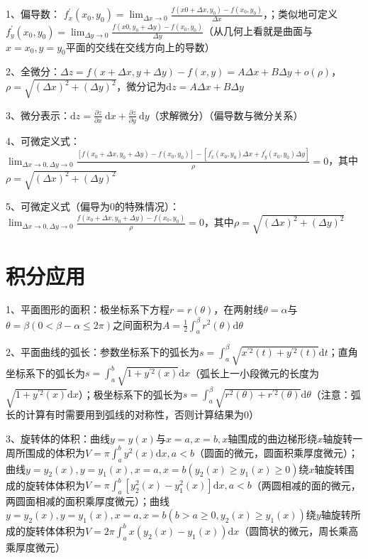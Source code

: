 1、偏导数： $f_{x}^{\prime}\left(x_{0}, y_{0}\right)=\lim_{\Delta x \rightarrow 0} \frac{f\left(x{0}+\Delta x, y_{0}\right)-f\left(x_{0}, y_{0}\right)}{\Delta x}$，；类似地可定义$f_{y}^{\prime}\left(x_{0}, y_{0}\right)=\lim_{\Delta y \rightarrow 0} \frac{f\left(x{0}, y_{0}+\Delta y\right)-f\left(x_{0}, y_{0}\right)}{\Delta y}$（从几何上看就是曲面与$x=x_0,y=y_0$平面的交线在交线方向上的导数）

2、全微分：$\Delta z=f(x+\Delta x, y+\Delta y)-f(x, y)=A \Delta x+B \Delta y+o(\rho)$，$\rho=\sqrt{(\Delta x)^{2}+(\Delta y)^{2}}$，微分记为$\mathrm{d} z=A \Delta x+B \Delta y$

3、微分表示：$\mathrm{d} z=\frac{\partial z}{\partial x} \mathrm{~d} x+\frac{\partial z}{\partial y} \mathrm{~d} y$（求解微分）（偏导数与微分关系）

4、可微定义式：$\lim_{\Delta x \rightarrow 0,\Delta y \rightarrow 0}\frac{\left[f\left(x_{0}+\Delta x, y_{0}+\Delta y\right)-f\left(x_{0}, y_{0}\right)\right]-\left[f_{x}^{\prime}\left(x_{0}, y_{0}\right) \Delta x+f_{y}^{\prime}\left(x_{0}, y_{0}\right) \Delta y\right]}{\rho}=0$，其中$\rho=\sqrt{(\Delta x)^{2}+(\Delta y)^{2}}$

5、可微定义式（偏导为0的特殊情况）：$\lim_{\Delta x \rightarrow 0,\Delta y \rightarrow 0}\frac{f\left(x_{0}+\Delta x, y_{0}+\Delta y\right)-f\left(x_{0}, y_{0}\right)}{\rho}=0$，其中$\rho=\sqrt{(\Delta x)^{2}+(\Delta y)^{2}}$

\section{积分应用}

1、平面图形的面积：极坐标系下方程$r=r(\theta)$，在两射线$\theta=\alpha$与$\theta=\beta(0<\beta-\alpha \leqslant 2 \pi)$之间面积为$A=\frac{1}{2} \int_{a}^{\beta} r^{2}(\theta) \mathrm{d} \theta$

2、平面曲线的弧长：参数坐标系下的弧长为$s=\int_{a}^{\beta} \sqrt{x^{\prime 2}(t)+y^{\prime 2}(t)} \mathrm{d} t$；直角坐标系下的弧长为$s=\int_{a}^{b} \sqrt{1+y^{\prime 2}(x)} \mathrm{d} x$（弧长上一小段微元的长度为$\sqrt{1+y^{\prime 2}(x)} \mathrm{d} x$）；极坐标系下的弧长为$s=\int_{a}^{\beta} \sqrt{r^{2}(\theta)+r^{\prime 2}(\theta)} \mathrm{d} \theta$（注意：弧长的计算有时需要用到弧线的对称性，否则计算结果为0）

3、旋转体的体积：曲线$y=y(x)$与$x=a, x=b, x$轴围成的曲边梯形绕$x$轴旋转一周所围成的体积为$V=\pi \int_{a}^{b} y^{2}(x) \mathrm{d} x, a<b$（圆面的微元，圆面积乘厚度微元）；曲线$y=y_{2}(x), y=y_{1}(x), x=a, x=b\left(y_{2}(x) \geqslant y_{1}(x) \geqslant 0\right)$绕$x$轴旋转围成的旋转体体积为$V=\pi \int_{a}^{b}\left[y_{2}^{2}(x)-y_{1}^{2}(x)\right] \mathrm{d} x, a<b$（两圆相减的面的微元，两圆面相减的面积乘厚度微元）；曲线$y=y_{2}(x), y=y_{1}(x), x=a, x=b\left(b>a \geqslant 0, y_{2}(x) \geqslant y_{1}(x)\right)$绕$y$轴旋转所成的旋转体体积为$V=2 \pi \int_{a}^{b} x\left(y_{2}(x)-y_{1}(x)\right) \mathrm{d} x$（圆筒状的微元，周长乘高乘厚度微元）

